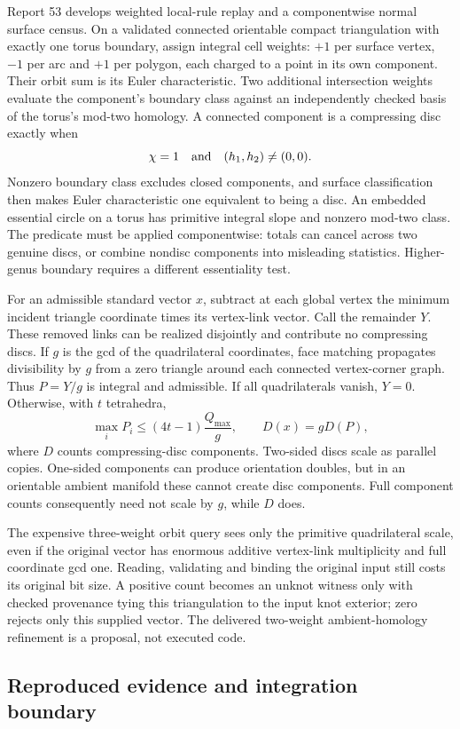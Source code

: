 Report 53 develops weighted local-rule replay and a componentwise normal
surface census. On a validated connected orientable compact triangulation
with exactly one torus boundary, assign integral cell weights: $+1$ per
surface vertex, $-1$ per arc and $+1$ per polygon, each charged to a point
in its own component. Their orbit sum is its Euler characteristic. Two
additional intersection weights evaluate the component's boundary class
against an independently checked basis of the torus's mod-two homology.
A connected component is a compressing disc exactly when
\[
 \chi=1\quad\hbox{and}\quad (h_1,h_2)\ne(0,0).
\]
Nonzero boundary class excludes closed components, and surface classification
then makes Euler characteristic one equivalent to being a disc. An embedded
essential circle on a torus has primitive integral slope and nonzero mod-two
class. The predicate must be applied componentwise: totals can cancel across
two genuine discs, or combine nondisc components into misleading statistics.
Higher-genus boundary requires a different essentiality test.

For an admissible standard vector $x$, subtract at each global vertex the
minimum incident triangle coordinate times its vertex-link vector. Call the
remainder $Y$. These removed links can be realized disjointly and contribute
no compressing discs. If $g$ is the gcd of the quadrilateral coordinates,
face matching propagates divisibility by $g$ from a zero triangle around
each connected vertex-corner graph. Thus $P=Y/g$ is integral and admissible.
If all quadrilaterals vanish, $Y=0$. Otherwise, with $t$ tetrahedra,
\[
 \max_iP_i\le(4t-1)\frac{Q_{\max}}g,
 \qquad D(x)=gD(P),
\]
where $D$ counts compressing-disc components. Two-sided discs scale as
parallel copies. One-sided components can produce orientation doubles,
but in an orientable ambient manifold these cannot create disc components.
Full component counts consequently need not scale by $g$, while $D$ does.

The expensive three-weight orbit query sees only the primitive quadrilateral
scale, even if the original vector has enormous additive vertex-link
multiplicity and full coordinate gcd one. Reading, validating and binding the
original input still costs its original bit size. A positive count becomes an
unknot witness only with checked provenance tying this triangulation to the
input knot exterior; zero rejects only this supplied vector. The delivered
two-weight ambient-homology refinement is a proposal, not executed code.

\subsection{Reproduced evidence and integration boundary}

